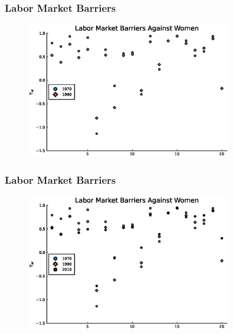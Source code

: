 \documentclass[11pt]{beamer}
\begin{document}
\begin{frame}
\frametitle{Labor Market Barriers}
\begin{figure}
\begin{center}
\includegraphics[width=0.8\textwidth]{plots/tau_w_women_70_90.eps}
\label{ }
\end{center}
\end{figure}
\hyperlink{occupations}{}
\end{frame}

\begin{frame}
\frametitle{Labor Market Barriers}
\label{barriers3}
\begin{figure}
\begin{center}
\includegraphics[width=0.8\textwidth]{plots/tau_w_women_70_10.eps}
\label{ }
\end{center}
\end{figure}
\hyperlink{occupations}{}
\hyperlink{aggprod}{}
\end{frame}
\end{document}
